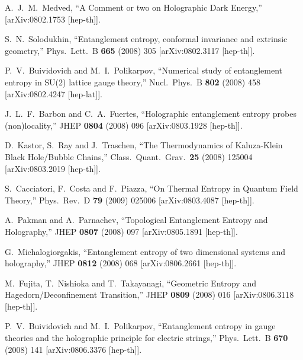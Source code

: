 \documentclass[12pt]{article}
\begin{document}
\begin{thebibliography}{99}
  A.~J.~M.~Medved,
  ``A Comment or two on Holographic Dark Energy,''
  [arXiv:0802.1753 [hep-th]].

  S.~N.~Solodukhin,
  ``Entanglement entropy, conformal invariance and extrinsic geometry,''
  Phys.\ Lett.\  B {\bf 665} (2008) 305
  [arXiv:0802.3117 [hep-th]].

  P.~V.~Buividovich and M.~I.~Polikarpov,
  ``Numerical study of entanglement entropy in SU(2) lattice gauge theory,''
  Nucl.\ Phys.\  B {\bf 802} (2008) 458
  [arXiv:0802.4247 [hep-lat]].

  J.~L.~F.~Barbon and C.~A.~Fuertes,
  ``Holographic entanglement entropy probes (non)locality,''
  JHEP {\bf 0804} (2008) 096
  [arXiv:0803.1928 [hep-th]].

  D.~Kastor, S.~Ray and J.~Traschen,
  ``The Thermodynamics of Kaluza-Klein Black Hole/Bubble Chains,''
  Class.\ Quant.\ Grav.\  {\bf 25} (2008) 125004
  [arXiv:0803.2019 [hep-th]].

  S.~Cacciatori, F.~Costa and F.~Piazza,
  ``On Thermal Entropy in Quantum Field Theory,''
  Phys.\ Rev.\  D {\bf 79} (2009) 025006
  [arXiv:0803.4087 [hep-th]].

  A.~Pakman and A.~Parnachev,
  ``Topological Entanglement Entropy and Holography,''
  JHEP {\bf 0807} (2008) 097
  [arXiv:0805.1891 [hep-th]].

  G.~Michalogiorgakis,
  ``Entanglement entropy of two dimensional systems and holography,''
  JHEP {\bf 0812} (2008) 068
  [arXiv:0806.2661 [hep-th]].

  M.~Fujita, T.~Nishioka and T.~Takayanagi,
  ``Geometric Entropy and Hagedorn/Deconfinement Transition,''
  JHEP {\bf 0809} (2008) 016
  [arXiv:0806.3118 [hep-th]].

  P.~V.~Buividovich and M.~I.~Polikarpov,
  ``Entanglement entropy in gauge theories and the holographic principle for
  electric strings,''
  Phys.\ Lett.\  B {\bf 670} (2008) 141
  [arXiv:0806.3376 [hep-th]].


\end{thebibliography}
\end{document}
